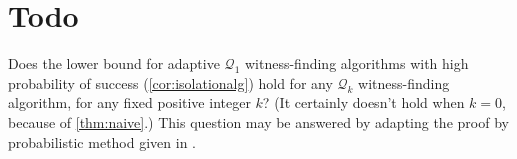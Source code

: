 \documentclass{article}
\newcommand{\mc}{\mathcal}
\begin{document}
\section{Todo}

Does the lower bound for adaptive $\mc{Q}_1$ witness-finding algorithms with high probability of success (\autoref{cor:isolationalg}) hold for any $\mc{Q}_k$ witness-finding algorithm, for any fixed positive integer $k$?
(It certainly doesn't hold when $k = 0$, because of \autoref{thm:naive}.)
This question may be answered by adapting the proof by probabilistic method given in \autocite{ablp91}.

\printbibliography
\end{document}
